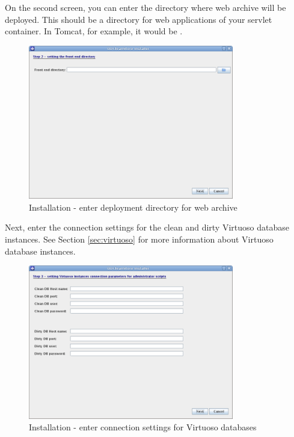 \FloatBarrier

On the second screen, you can enter the directory where \FE web archive will be deployed. This should be a directory for web applications of your servlet container. In Tomcat, for example, it would be .

\begin{figure}[!h]
    \centering
    \includegraphics[width=0.8\textwidth]{images/install-step-02.png}
    \caption{Installation - enter deployment directory for \FE web archive}
\end{figure}

\FloatBarrier

Next, enter the connection settings for the clean and dirty Virtuoso database instances. See Section \ref{sec:virtuoso} for more information about Virtuoso database instances.

\begin{figure}[!h]
    \centering
    \includegraphics[width=0.8\textwidth]{images/install-step-03.png}
    \caption{Installation - enter connection settings for Virtuoso databases}
\end{figure}



